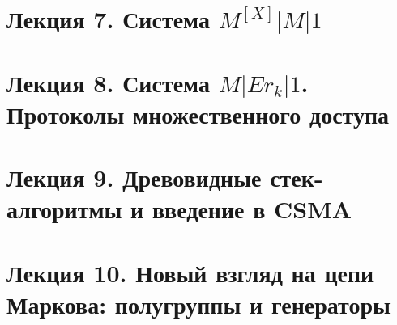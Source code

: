 \chapter{Лекция 7. Система $M^{[X]}|M|1$}


\chapter{Лекция 8. Система $M|Er_k|1$. Протоколы множественного доступа}


\chapter{Лекция 9. Древовидные стек-алгоритмы и введение в CSMA}


\chapter{Лекция 10. Новый взгляд на цепи Маркова: полугруппы и генераторы}



